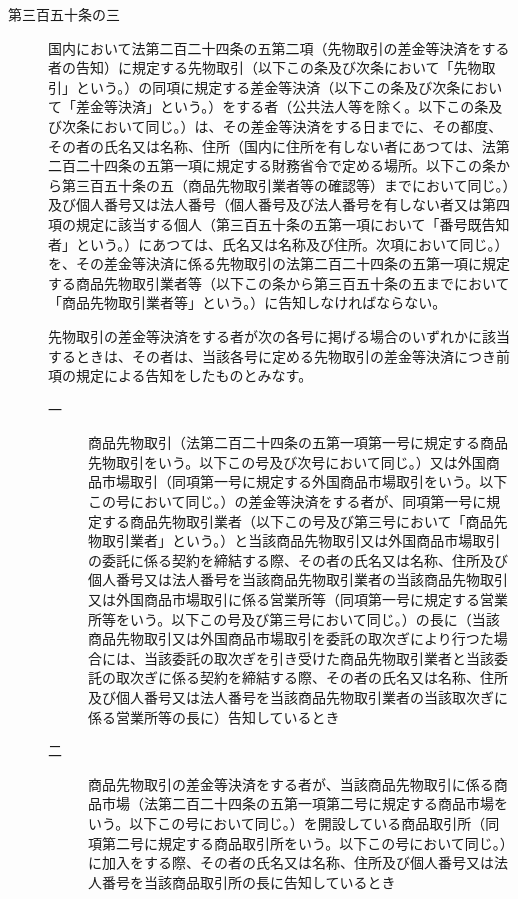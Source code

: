 \documentclass[twocolumn,a4j,10pt]{ltjtarticle}
\begin{document}
\begin{description}
\item[第三百五十条の三]国内において法第二百二十四条の五第二項（先物取引の差金等決済をする者の告知）に規定する先物取引（以下この条及び次条において「先物取引」という。）の同項に規定する差金等決済（以下この条及び次条において「差金等決済」という。）をする者（公共法人等を除く。以下この条及び次条において同じ。）は、その差金等決済をする日までに、その都度、その者の氏名又は名称、住所（国内に住所を有しない者にあつては、法第二百二十四条の五第一項に規定する財務省令で定める場所。以下この条から第三百五十条の五（商品先物取引業者等の確認等）までにおいて同じ。）及び個人番号又は法人番号（個人番号及び法人番号を有しない者又は第四項の規定に該当する個人（第三百五十条の五第一項において「番号既告知者」という。）にあつては、氏名又は名称及び住所。次項において同じ。）を、その差金等決済に係る先物取引の法第二百二十四条の五第一項に規定する商品先物取引業者等（以下この条から第三百五十条の五までにおいて「商品先物取引業者等」という。）に告知しなければならない。
\item[]先物取引の差金等決済をする者が次の各号に掲げる場合のいずれかに該当するときは、その者は、当該各号に定める先物取引の差金等決済につき前項の規定による告知をしたものとみなす。
\begin{description}
\item[一]商品先物取引（法第二百二十四条の五第一項第一号に規定する商品先物取引をいう。以下この号及び次号において同じ。）又は外国商品市場取引（同項第一号に規定する外国商品市場取引をいう。以下この号において同じ。）の差金等決済をする者が、同項第一号に規定する商品先物取引業者（以下この号及び第三号において「商品先物取引業者」という。）と当該商品先物取引又は外国商品市場取引の委託に係る契約を締結する際、その者の氏名又は名称、住所及び個人番号又は法人番号を当該商品先物取引業者の当該商品先物取引又は外国商品市場取引に係る営業所等（同項第一号に規定する営業所等をいう。以下この号及び第三号において同じ。）の長に（当該商品先物取引又は外国商品市場取引を委託の取次ぎにより行つた場合には、当該委託の取次ぎを引き受けた商品先物取引業者と当該委託の取次ぎに係る契約を締結する際、その者の氏名又は名称、住所及び個人番号又は法人番号を当該商品先物取引業者の当該取次ぎに係る営業所等の長に）告知しているとき
\item[二]商品先物取引の差金等決済をする者が、当該商品先物取引に係る商品市場（法第二百二十四条の五第一項第二号に規定する商品市場をいう。以下この号において同じ。）を開設している商品取引所（同項第二号に規定する商品取引所をいう。以下この号において同じ。）に加入をする際、その者の氏名又は名称、住所及び個人番号又は法人番号を当該商品取引所の長に告知しているとき

\end{description}
\end{description}
\end{document}
